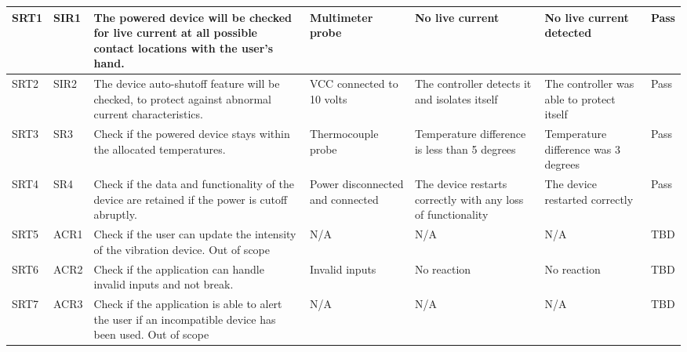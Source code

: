 \documentclass[12pt, titlepage]{article}
\begin{document}
\begin{longtable}{|p{1.4cm}|p{1.1cm}|p{2.5cm}|p{1.5cm}|p{2.2cm}|p{1.9cm}|p{1.2cm}|}
  SRT1                              & SIR1         & The powered device will be checked for live current at all possible contact locations with the user’s hand. & Multimeter probe                                 & No live current                                              & No live current detected                  & {\color[HTML]{32CB00} Pass}             \\ \hline
  SRT2                              & SIR2         & The device auto-shutoff feature will be checked, to protect against abnormal current characteristics.       & VCC connected to 10 volts                        & The controller detects it and isolates itself                & The controller was able to protect itself & {\color[HTML]{32CB00} Pass}             \\ \hline
  SRT3                              & SR3          & Check if the powered device stays within the allocated temperatures.                                        & Thermocouple probe                               & Temperature difference is less than 5 degrees               & Temperature difference was 3 degrees      & {\color[HTML]{32CB00} Pass}             \\ \hline
  SRT4                              & SR4                               & Check if the data and functionality of the device are retained if the power is cutoff abruptly.                                  & Power disconnected and connected                 & The device restarts correctly with any loss of functionality & The device restarted correctly            & {\color[HTML]{32CB00} Pass}             \\ \hline
  SRT5                              & ACR1                              & Check if the user can update the intensity of the vibration device. Out of scope                                                 & N/A                                              & N/A                                                          & N/A                                       & {\color[HTML]{F8A102} TBD}             \\ \hline
  SRT6                              & ACR2                              & Check if the application can handle invalid inputs and not break.                                                                & Invalid inputs                                   & No reaction                                                  & No reaction                               & {\color[HTML]{F8A102} TBD}             \\ \hline
  SRT7                              & ACR3                              & Check if the application is able to alert the user if an incompatible device has been used. Out of scope                         & N/A                                              & N/A                                                          & N/A                                       & {\color[HTML]{F8A102} TBD}             \\ \hline

\end{longtable}
\end{document}
